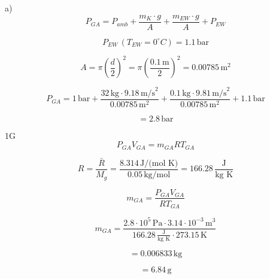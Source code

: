 a) 
\[
P_{GA} = P_{amb} + \frac{m_K \cdot g}{A} + \frac{m_{EW} \cdot g}{A} + P_{EW}
\]

\[
P_{EW} \, (T_{EW} = 0^\circ C) = 1.1 \, \text{bar}
\]

\[
A = \pi \left( \frac{d}{2} \right)^2 = \pi \left( \frac{0.1 \, \text{m}}{2} \right)^2 = 0.00785 \, \text{m}^2
\]

\[
P_{GA} = 1 \, \text{bar} + \frac{32 \, \text{kg} \cdot 9.18 \, \text{m/s}^2}{0.00785 \, \text{m}^2} + \frac{0.1 \, \text{kg} \cdot 9.81 \, \text{m/s}^2}{0.00785 \, \text{m}^2} + 1.1 \, \text{bar}
\]

\[
= 2.8 \, \text{bar}
\]

1G 
\[
P_{GA} V_{GA} = m_{GA} R T_{GA}
\]

\[
R = \frac{\bar{R}}{M_g} = \frac{8.314 \, \text{J/(mol K)}}{0.05 \, \text{kg/mol}} = 166.28 \, \frac{\text{J}}{\text{kg K}}
\]

\[
m_{GA} = \frac{P_{GA} V_{GA}}{R T_{GA}}
\]

\[
m_{GA} = \frac{2.8 \cdot 10^5 \, \text{Pa} \cdot 3.14 \cdot 10^{-3} \, \text{m}^3}{166.28 \, \frac{\text{J}}{\text{kg K}} \cdot 273.15 \, \text{K}}
\]

\[
= 0.006833 \, \text{kg}
\]

\[
= 6.84 \, \text{g}
\]